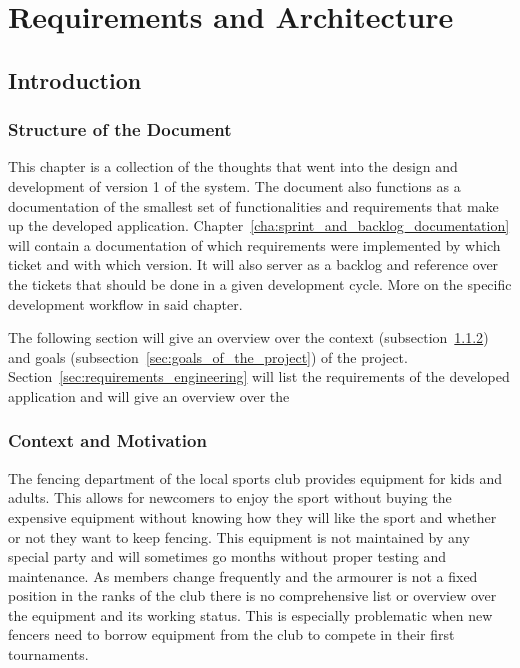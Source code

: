 \chapter{Requirements and Architecture}\label{cha:requirements_and_architecture}\thispagestyle{fancy}
\section{Introduction}\label{sec:introduction}
\subsection{Structure of the Document}\label{sec:structure_of_document}
This chapter is a collection of the thoughts that went into the design and development of version 1 of the system. The document
also functions as a documentation of the smallest set of functionalities and requirements that make up the developed application.
Chapter~\ref{cha:sprint_and_backlog_documentation} will contain a documentation of which requirements were implemented by which
ticket and with which version. It will also server as a backlog and reference over the tickets that should be done in a given
development cycle. More on the specific development workflow in said chapter.

The following section will give an overview over the context (subsection~\ref{sec:context_and_motivation}) and goals
(subsection~\ref{sec:goals_of_the_project}) of the project. Section~\ref{sec:requirements_engineering} will list the requirements 
of the developed application and will give an overview over the 

\subsection{Context and Motivation}\label{sec:context_and_motivation}
The fencing department of the local sports club provides equipment for kids and adults. This allows for newcomers to enjoy the
sport without buying the expensive equipment without knowing how they will like the sport and whether or not they want to 
keep fencing. This equipment is not maintained by any special party and will sometimes go months without proper testing and 
maintenance. As members change frequently and the armourer is not a fixed position in the ranks of the club there is no
comprehensive list or overview over the equipment and its working status. This is especially problematic when new fencers need
to borrow equipment from the club to compete in their first tournaments.

